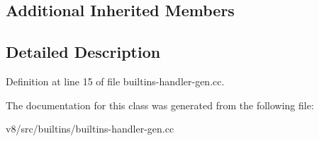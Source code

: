 \subsection*{Additional Inherited Members}


\subsection{Detailed Description}


Definition at line 15 of file builtins-\/handler-\/gen.\+cc.



The documentation for this class was generated from the following file\+:\begin{DoxyCompactItemize}
\item 
v8/src/builtins/builtins-\/handler-\/gen.\+cc\end{DoxyCompactItemize}

